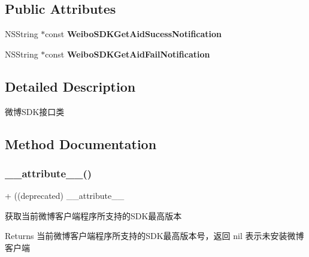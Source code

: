 \subsection*{Public Attributes}
\begin{DoxyCompactItemize}
\item 
\mbox{\label{interface_weibo_s_d_k_ac25409a625b51ee640ed63a979ecb31d}} 
N\+S\+String $\ast$const {\bfseries Weibo\+S\+D\+K\+Get\+Aid\+Sucess\+Notification}
\item 
\mbox{\label{interface_weibo_s_d_k_a58daf87cbc35160c0a9fdfb1d658b2d3}} 
N\+S\+String $\ast$const {\bfseries Weibo\+S\+D\+K\+Get\+Aid\+Fail\+Notification}
\end{DoxyCompactItemize}


\subsection{Detailed Description}
微博\+S\+D\+K接口类 

\subsection{Method Documentation}
\mbox{\label{interface_weibo_s_d_k_a40d5808e5f4f3957ef8255baeaa3c484}} 
\subsubsection{\texorpdfstring{\+\_\+\+\_\+attribute\+\_\+\+\_\+()}{\_\_attribute\_\_()}\hspace{0.1cm}{\footnotesize\ttfamily [1/3]}}
{\footnotesize\ttfamily + ((deprecated) \+\_\+\+\_\+attribute\+\_\+\+\_\+ \begin{DoxyParamCaption}{ }\end{DoxyParamCaption}}

获取当前微博客户端程序所支持的\+S\+D\+K最高版本 \begin{DoxyReturn}{Returns}
当前微博客户端程序所支持的\+S\+D\+K最高版本号，返回 nil 表示未安装微博客户端 
\end{DoxyReturn}
\mbox{\label{interface_weibo_s_d_k_a40d5808e5f4f3957ef8255baeaa3c484}} 

